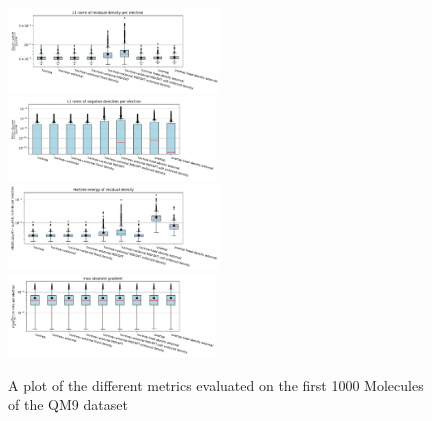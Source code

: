 \begin{figure}[h]
    \includegraphics[width=0.5\textwidth]{chapters/results/results_images/L1_residual_densities_on_even_tempered_2.5}
    \includegraphics[width=0.49\textwidth]{chapters/results/results_images/L1_negative_densities_on_even_tempered_2.5}
    \includegraphics[width=0.5\textwidth]{chapters/results/results_images/L2_residual_hartree_on_even_tempered_2.5}
    \includegraphics[width=0.49\textwidth]{chapters/results/results_images/max_abs_gradient_on_even_tempered_2.5}
    
    \caption{A plot of the different metrics evaluated on the first 1000 Molecules of the QM9 dataset}
    \label{fig:my_label}
\end{figure}







